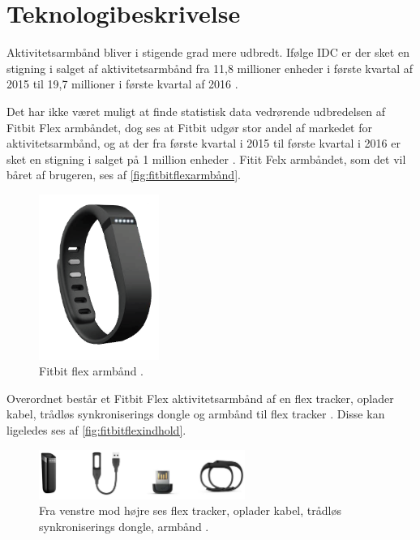 
\section{Teknologibeskrivelse}
Aktivitetsarmbånd bliver i stigende grad mere udbredt. Ifølge IDC er der sket en stigning i salget af aktivitetsarmbånd fra 11,8 millioner enheder i første kvartal af 2015 til 19,7 millioner i første kvartal af 2016 \citep{IDC2016}.

Det har ikke været muligt at finde statistisk data vedrørende udbredelsen af Fitbit Flex armbåndet, dog ses at Fitbit udgør stor andel af markedet for aktivitetsarmbånd, og at der fra første kvartal i 2015 til første kvartal i 2016 er sket en stigning i salget på 1 million enheder \citep{IDC2016}.  
Fitit Felx armbåndet, som det vil båret af brugeren, ses af \autoref{fig:fitbitflexarmbånd}. 

\begin{figure}[H]
	\centering
	\includegraphics[width=0.35\textwidth]{figures/fitbitflex}
	\caption{Fitbit flex armbånd \citep{fitbitflex}.}
	\label{fig:fitbitflexarmbånd}
\end{figure}

Overordnet består et Fitbit Flex aktivitetsarmbånd af en flex tracker, oplader kabel, trådløs synkroniserings dongle og armbånd til flex tracker \citep{fitbitflex}. Disse kan ligeledes ses af \autoref{fig:fitbitflexindhold}. 

\begin{figure}[H]
	\centering
	\includegraphics[width=0.6\textwidth]{figures/fitbitflexindhold}
	\caption{Fra venstre mod højre ses flex tracker, oplader kabel, trådløs synkroniserings dongle, armbånd \citep{fitbitflex}.}
	\label{fig:fitbitflexindhold}
\end{figure}

